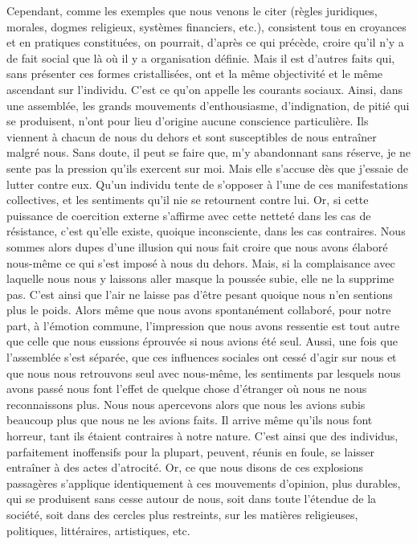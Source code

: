 \documentclass[french,twoside]{book} %
\begin{document}
Cependant, comme les exemples que nous venons le citer (règles juridiques, morales, dogmes religieux, systèmes financiers, etc.), consistent tous en croyances et en pratiques constituées, on pourrait, d’après ce qui précède, croire qu’il n’y a de fait social que là où il y a organisation définie. Mais il est d’autres faits qui, sans présenter ces formes cristallisées, ont et la même objectivité et le même ascendant sur l’individu. C’est ce qu’on appelle les courants sociaux. Ainsi, dans une assemblée, les grands mouvements d’enthousiasme, d’indignation, de pitié qui se produisent, n’ont pour lieu d’origine aucune conscience particulière. Ils viennent à chacun de nous du dehors et sont susceptibles de nous entraîner malgré nous. Sans doute, il peut se faire que, m’y abandonnant sans réserve, je ne sente pas la pression qu’ils exercent sur moi. Mais elle s’accuse dès que j’essaie de lutter contre eux. Qu’un individu tente de s’opposer à l’une de ces manifestations collectives, et les sentiments qu’il nie se retournent contre lui. Or, si cette puissance de coercition externe s’affirme avec cette netteté dans les cas de résistance, c’est qu’elle existe, quoique inconsciente, dans les cas contraires. Nous sommes alors dupes d’une illusion qui nous fait croire que nous avons élaboré nous-même ce qui s’est imposé à nous du dehors. Mais, si la complaisance avec laquelle nous nous y laissons aller masque la poussée subie, elle ne la supprime pas. C’est ainsi que l’air ne laisse pas d’être pesant quoique nous n’en sentions plus le poids. Alors même que nous avons spontanément collaboré, pour notre part, à l’émotion commune, l’impression que nous avons ressentie est tout autre que celle que nous eussions éprouvée si nous avions été seul. Aussi, une fois que l’assemblée s’est séparée, que ces influences sociales ont cessé d’agir sur nous et que nous nous retrouvons seul avec nous-même, les sentiments par lesquels nous avons passé nous font l’effet de quelque chose d’étranger où nous ne nous reconnaissons plus. Nous nous apercevons alors que nous les avions subis beaucoup plus que nous ne les avions faits. Il arrive même qu’ils nous font horreur, tant ils étaient contraires à notre nature. C’est ainsi que des individus, parfaitement inoffensifs pour la plupart, peuvent, réunis en foule, se laisser entraîner à des actes d’atrocité. Or, ce que nous disons de ces explosions passagères s’applique identiquement à ces mouvements d’opinion, plus durables, qui se produisent sans cesse autour de nous, soit dans toute l’étendue de la société, soit dans des cercles plus restreints, sur les matières religieuses, politiques, littéraires, artistiques, etc.\par
\end{document}
